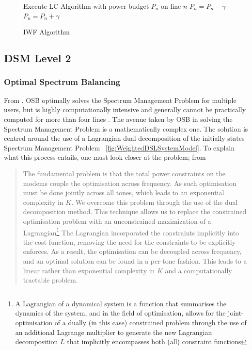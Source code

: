 \begin{figure}[h!]
\begin{algorithmic}
\REPEAT
{}
\STATE Execute LC Algorithm with power budget \(P_n\) on line \(n\)
\STATE \(P_n=P_n-\gamma\)
\ELSE
\STATE \(P_n=P_n+\gamma\)
\ENDIF
\ENDFOR
{}
\end{algorithmic}
\caption{IWF Algorithm}
\label{fig:IWFAlgorithm}
\end{figure}

\subsection{DSM Level 2}
\subsubsection{Optimal Spectrum Balancing}
From \cite{RC04}, OSB optimally solves the Spectrum Management Problem for multiple users, but is highly computationally intensive and generally cannot be practically computed for more than four lines \cite{AM09}. The avenue taken by OSB in solving the Spectrum Management Problem is a mathematically complex one. The solution is centred around the use of a Lagrangian dual decomposition of the initially states Spectrum Management Problem ~\eqref{fig:WeightedDSLSystemModel}. To explain what this process entails, one must look closer at the problem; from \cite{RC04}

\begin{quotation}
  The fundamental problem is that the total power constraints on the modems couple the optimisation across frequency. As such optimisation must be done jointly across all tones, which leads to an exponential complexity in \(K\). We overcome this problem through the use of the dual decomposition method. This technique allows us to replace the constrained optimisation problem with an unconstrained maximization of a Lagrangian\footnote{A Lagrangian of a dynamical system is a function that summarises the dynamics of the system, and in the field of optimisation, allows for the joint-optimisation of a dually (in this case) constrained problem through the use of an additional Lagrange multiplier to generate the new Lagrangian decomposition \(L\) that implicitly encompasses both (all) constraint functions} The Lagrangian incorporated the constraints implicitly into the cost function, removing the need for the constraints to be explicitly enforces. As a result, the optimisation can be decoupled across frequency, and an optimal solution can be found in a per-tone fashion. This leads to a linear rather than exponential complexity in \(K\) and a computationally tractable problem.
\end{quotation}
 
